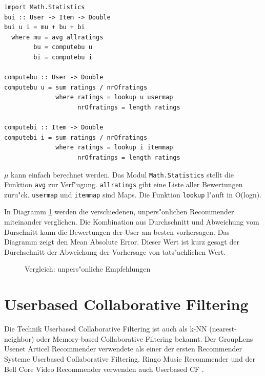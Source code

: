 \documentclass[a4paper, 12pt]{article}
\begin{document}
\begin{lstlisting}[caption=Baseline predictor, label=lst:baseline]
import Math.Statistics
bui :: User -> Item -> Double
bui u i = mu + bu + bi
  where mu = avg allratings
        bu = computebu u
        bi = computebu i

computebu :: User -> Double
computebu u = sum ratings / nrOfratings
              where ratings = lookup u usermap
                    nrOfratings = length ratings

computebi :: Item -> Double
computebi i = sum ratings / nrOfratings
              where ratings = lookup i itemmap
                    nrOfratings = length ratings
\end{lstlisting}

$\mu$ kann einfach berechnet werden. Das Modul \verb|Math.Statistics| stellt die Funktion \verb|avg| zur Verf"ugung. \verb|allratings| gibt eine Liste aller Bewertungen zuru"ck. \verb|usermap| und \verb|itemmap| sind Maps. Die Funktion \verb|lookup| l"auft in O(logn).

In Diagramm \ref{fig:maebaselines} werden die verschiedenen, unpers"onlichen Recommender miteinander verglichen. Die Kombination aus Durchschnitt und Abweichung vom Durschnitt kann die Bewertungen der User am besten vorhersagen. Das Diagramm zeigt den Mean Absolute Error. Dieser Wert ist kurz gesagt der Durchschnitt der Abweichung der Vorhersage von tats"achlichen Wert.

\begin{figure}
  \centering
{}
  
  \caption{Vergleich: unpers"onliche Empfehlungen}
  \label{fig:maebaselines}
\end{figure}


\section{Userbased Collaborative Filtering}

Die Technik Userbased Collaborative Filtering ist auch als k-NN (nearest-neighbor) oder Memory-based Collaborative Filtering bekannt. Der GroupLens Usenet Articel Recommender verwendete als einer der ersten Recommender Systeme Userbased Collaborative Filtering. Ringo Music Recommender und der Bell Core Video Recommender verwenden auch Userbased CF \cite{ekstrand11}.
\end{document}

